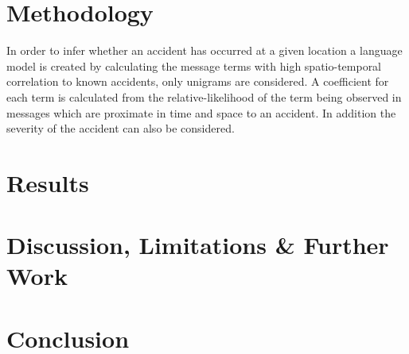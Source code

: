 \documentclass{article}
\begin{document}
\section{Methodology}

In order to infer whether an accident has occurred at a given location a language model is created by calculating the message terms with high spatio-temporal correlation to known accidents, only unigrams are considered. A coefficient for each term is calculated from the relative-likelihood of the term being observed in messages which are proximate in time and space to an accident. In addition the severity of the accident can also be considered. 



\section{Results}


\section{Discussion, Limitations \& Further Work}



\section{Conclusion}


\balance



\end{document}
